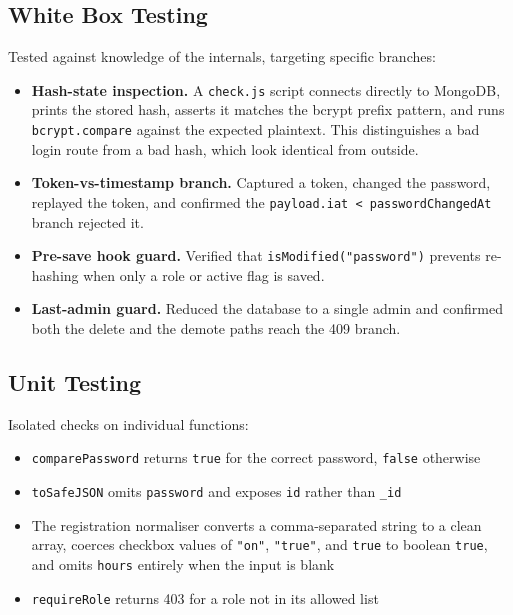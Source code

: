 \documentclass[11pt,letterpaper]{article}
\begin{document}
\subsection{White Box Testing}

Tested against knowledge of the internals, targeting specific branches:

\begin{itemize}
  \item \textbf{Hash-state inspection.} A \texttt{check.js} script connects
        directly to MongoDB, prints the stored hash, asserts it matches the
        bcrypt prefix pattern, and runs \texttt{bcrypt.compare} against the
        expected plaintext. This distinguishes a bad login route from a bad
        hash, which look identical from outside.
  \item \textbf{Token-vs-timestamp branch.} Captured a token, changed the
        password, replayed the token, and confirmed the
        \texttt{payload.iat < passwordChangedAt} branch rejected it.
  \item \textbf{Pre-save hook guard.} Verified that
        \texttt{isModified("password")} prevents re-hashing when only a role or
        active flag is saved.
  \item \textbf{Last-admin guard.} Reduced the database to a single admin and
        confirmed both the delete and the demote paths reach the 409 branch.
\end{itemize}

\subsection{Unit Testing}

Isolated checks on individual functions:

\begin{itemize}
  \item \texttt{comparePassword} returns \texttt{true} for the correct password,
        \texttt{false} otherwise
  \item \texttt{toSafeJSON} omits \texttt{password} and exposes \texttt{id}
        rather than \texttt{\_id}
  \item The registration normaliser converts a comma-separated string to a clean
        array, coerces checkbox values of \texttt{"on"}, \texttt{"true"}, and
        \texttt{true} to boolean \texttt{true}, and omits \texttt{hours}
        entirely when the input is blank
  \item \texttt{requireRole} returns 403 for a role not in its allowed list
\end{itemize}
\end{document}
